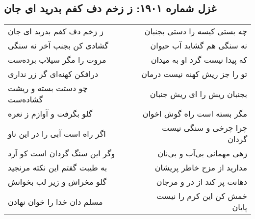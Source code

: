 \begin{center}
\section*{غزل شماره ۱۹۰۱: ز زخم دف کفم بدرید ای جان}
\label{sec:1901}
\begin{longtable}{l p{0.5cm} r}
ز زخم دف کفم بدرید ای جان
&&
چه بستی کیسه را دستی بجنبان
\\
گشادی کن بجنب آخر نه سنگی
&&
نه سنگی هم گشاید آب حیوان
\\
مروت را مگر سیلاب برده‌ست
&&
که پیدا نیست گرد او به میدان
\\
درافکن کهنه‌ای گر زر نداری
&&
تو را جز ریش کهنه نیست درمان
\\
چو دستت بسته و ریشت گشاده‌ست
&&
بجنبان ریش را ای ریش جنبان
\\
گلو بگرفت و آوازم ز نعره
&&
مگر بسته است راه گوش اخوان
\\
اگر راه است آبی را در این ناو
&&
چرا چرخی و سنگی نیست گردان
\\
وگر این سنگ گردان است کو آرد
&&
زهی مهمانی بی‌آب و بی‌نان
\\
به طیبت گفتم این نکته مرنجید
&&
مدارید از مزح خاطر پریشان
\\
گلو مخراش و زیر لب بخوانش
&&
دهانت پر کند از در و مرجان
\\
مسلم دان خدا را خوان نهادن
&&
خمش کن این کرم را نیست پایان
\\
\end{longtable}
\end{center}

